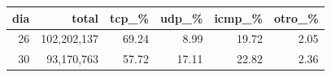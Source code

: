 \begin{tabular}{rrrrrr}
\toprule
dia & total & tcp\_\% & udp\_\% & icmp\_\% & otro\_\% \\
\midrule
26 & 102,202,137 & 69.24 & 8.99 & 19.72 & 2.05 \\
30 & 93,170,763 & 57.72 & 17.11 & 22.82 & 2.36 \\
\bottomrule
\end{tabular}

